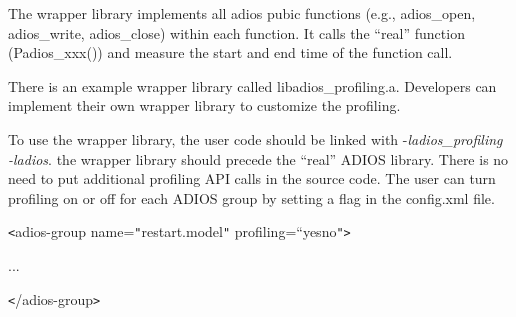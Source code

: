 \vspace{10pt}
The wrapper library implements all adios pubic functions (e.g., adios\_open, adios\_write, 
adios\_close) within each function. It calls the ``real'' function (Padios\_xxx()) 
and measure the start and end time of the function call. 

\vspace{10pt}
There is an example wrapper library called libadios\_profiling.a. Developers can 
implement their own wrapper library to customize the profiling.

\vspace{10pt}
To use the wrapper library, the user code should be linked with -\textit{ladios\_profiling 
-ladios}. the wrapper library should precede the ``real'' ADIOS library. There 
is no need to put additional profiling API calls in the source code. The user can 
turn profiling on or off for each ADIOS group by setting a flag in the config.xml 
file.

\vspace{10pt}
\texttt{<}adios-group name=\texttt{"}restart.model\texttt{"} profiling=``yes\textbar{}no\texttt{"}\texttt{>}

\vspace{10pt}
\parindent=14pt
...

\vspace{10pt}
\parindent=0pt
\texttt{<}/adios-group\texttt{>}

\label{HToc84890323}\label{HToc212016699}\label{HToc212016942}\label{HToc182553460}
